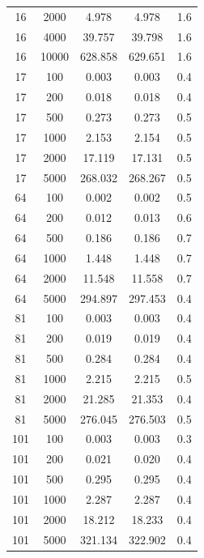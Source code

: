 \documentclass{deliverablereport}
\begin{document}
\begin{small}
\begin{center}
\begin{longtable}{|c|c|c|c|c|}
16&2000&4.978&4.978&1.6\\
16&4000&39.757&39.798&1.6\\
16&10000&628.858&629.651&1.6\\
17&100&0.003&0.003&0.4\\
17&200&0.018&0.018&0.4\\
17&500&0.273&0.273&0.5\\
17&1000&2.153&2.154&0.5\\
17&2000&17.119&17.131&0.5\\
17&5000&268.032&268.267&0.5\\
64&100&0.002&0.002&0.5\\
64&200&0.012&0.013&0.6\\
64&500&0.186&0.186&0.7\\
64&1000&1.448&1.448&0.7\\
64&2000&11.548&11.558&0.7\\
64&5000&294.897&297.453&0.4\\
81&100&0.003&0.003&0.4\\
81&200&0.019&0.019&0.4\\
81&500&0.284&0.284&0.4\\
81&1000&2.215&2.215&0.5\\
81&2000&21.285&21.353&0.4\\
81&5000&276.045&276.503&0.5\\
101&100&0.003&0.003&0.3\\
101&200&0.021&0.020&0.4\\
101&500&0.295&0.295&0.4\\
101&1000&2.287&2.287&0.4\\
101&2000&18.212&18.233&0.4\\
101&5000&321.134&322.902&0.4\\
  \end{longtable}
\end{center}


\end{small}
\end{document}

